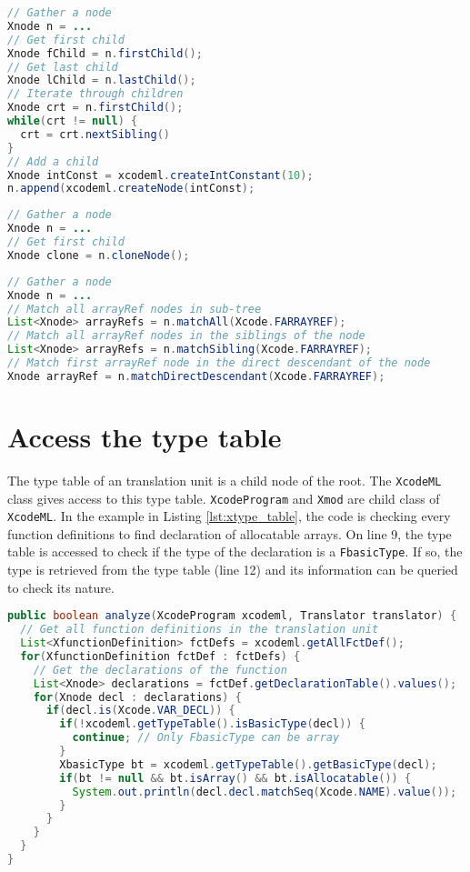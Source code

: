 \begin{lstlisting}[label=lst:xnode_node, language=Java, caption=XtypeTable]
// Gather a node
Xnode n = ...
// Get first child
Xnode fChild = n.firstChild();
// Get last child
Xnode lChild = n.lastChild();
// Iterate through children
Xnode crt = n.firstChild();
while(crt != null) {
  crt = crt.nextSibling()
}
// Add a child
Xnode intConst = xcodeml.createIntConstant(10);
n.append(xcodeml.createNode(intConst);
\end{lstlisting}

\begin{lstlisting}[label=lst:xnode_clone, language=Java, caption=XtypeTable]
// Gather a node
Xnode n = ...
// Get first child
Xnode clone = n.cloneNode();
\end{lstlisting}

\begin{lstlisting}[label=lst:xnode_match, language=Java, caption=XtypeTable]
// Gather a node
Xnode n = ...
// Match all arrayRef nodes in sub-tree
List<Xnode> arrayRefs = n.matchAll(Xcode.FARRAYREF);
// Match all arrayRef nodes in the siblings of the node
List<Xnode> arrayRefs = n.matchSibling(Xcode.FARRAYREF);
// Match first arrayRef node in the direct descendant of the node
Xnode arrayRef = n.matchDirectDescendant(Xcode.FARRAYREF);
\end{lstlisting}

\section{Access the type table}
The type table of an \xcodemlf translation unit is a child node of the root. 
The \lstinline|XcodeML| class gives access to this type table. 
\lstinline|XcodeProgram| and \lstinline|Xmod| are child class of 
\lstinline|XcodeML|. 
In the example in Listing \ref{lst:xtype_table}, the code is checking
every function definitions to find declaration of allocatable arrays.
On line 9, the type table is accessed to check if the type of the 
declaration is a \lstinline|FbasicType|. If so, the type is retrieved from
the type table (line 12) and its information can be queried to check its
nature.

\begin{lstlisting}[label=lst:xtype_table, language=Java, caption=XtypeTable]
public boolean analyze(XcodeProgram xcodeml, Translator translator) {
  // Get all function definitions in the translation unit
  List<XfunctionDefinition> fctDefs = xcodeml.getAllFctDef();
  for(XfunctionDefinition fctDef : fctDefs) {
    // Get the declarations of the function
    List<Xnode> declarations = fctDef.getDeclarationTable().values();
    for(Xnode decl : declarations) {
      if(decl.is(Xcode.VAR_DECL)) {
        if(!xcodeml.getTypeTable().isBasicType(decl)) {
          continue; // Only FbasicType can be array
        }
        XbasicType bt = xcodeml.getTypeTable().getBasicType(decl);
        if(bt != null && bt.isArray() && bt.isAllocatable()) {
          System.out.println(decl.decl.matchSeq(Xcode.NAME).value());
        }
      }
    }
  }
}
\end{lstlisting}



